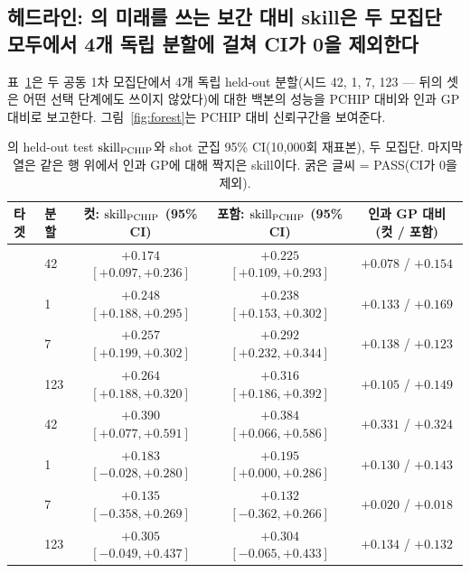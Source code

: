 \documentclass[10pt,a4paper]{article}
\begin{document}
\subsection{헤드라인: \Ti{}의 미래를 쓰는 보간 대비 skill은 두 모집단 모두에서 4개
독립 분할에 걸쳐 CI가 0을 제외한다}
\label{sec:headline}
표~\ref{tab:headline}은 두 공동 1차 모집단에서 4개 독립 held-out 분할(시드 42,
1, 7, 123 --- 뒤의 셋은 어떤 선택 단계에도 쓰이지 않았다)에 대한 백본의 성능을
PCHIP 대비와 인과 GP 대비로 보고한다. 그림~\ref{fig:forest}는 PCHIP 대비
신뢰구간을 보여준다.

\begin{table}[t]
  \centering
  \caption{\seqv{}의 held-out test $\mathrm{skill}_{\mathrm{PCHIP}}$와 shot 군집 95\% CI(10{,}000회
  재표본), 두 모집단. 마지막 열은 같은 행 위에서 인과 GP에 대해 짝지은 skill이다.
  굵은 글씨 = PASS(CI가 0을 제외).}
  \label{tab:headline}
  \small
  \begin{tabular}{llccc}
    \toprule
    타겟 & 분할 & 컷: $\mathrm{skill}_{\mathrm{PCHIP}}$ (95\% CI) & 포함: $\mathrm{skill}_{\mathrm{PCHIP}}$ (95\% CI) & 인과 GP 대비 (컷 / 포함) \\
    \midrule
    \multirow{4}{*}{\Ti{}}
      & 42  & $\mathbf{+0.174}$ $[+0.097, +0.236]$ & $\mathbf{+0.225}$ $[+0.109, +0.293]$ & $\mathbf{+0.078}$ / $\mathbf{+0.154}$ \\
      & 1   & $\mathbf{+0.248}$ $[+0.188, +0.295]$ & $\mathbf{+0.238}$ $[+0.153, +0.302]$ & $\mathbf{+0.133}$ / $\mathbf{+0.169}$ \\
      & 7   & $\mathbf{+0.257}$ $[+0.199, +0.302]$ & $\mathbf{+0.292}$ $[+0.232, +0.344]$ & $\mathbf{+0.138}$ / $\mathbf{+0.123}$ \\
      & 123 & $\mathbf{+0.264}$ $[+0.188, +0.320]$ & $\mathbf{+0.316}$ $[+0.186, +0.392]$ & $\mathbf{+0.105}$ / $\mathbf{+0.149}$ \\
    \midrule
    \multirow{4}{*}{\Vrot{}}
      & 42  & $\mathbf{+0.390}$ $[+0.077, +0.591]$ & $\mathbf{+0.384}$ $[+0.066, +0.586]$ & $\mathbf{+0.331}$ / $\mathbf{+0.324}$ \\
      & 1   & $+0.183$ $[-0.028, +0.280]$ & $\mathbf{+0.195}$ $[+0.000, +0.286]$ & $+0.130$ / $\mathbf{+0.143}$ \\
      & 7   & $+0.135$ $[-0.358, +0.269]$ & $+0.132$ $[-0.362, +0.266]$ & $+0.020$ / $+0.018$ \\
      & 123 & $+0.305$ $[-0.049, +0.437]$ & $+0.304$ $[-0.065, +0.433]$ & $\mathbf{+0.134}$ / $+0.132$ \\
    \bottomrule
  \end{tabular}
\end{table}
\end{document}
